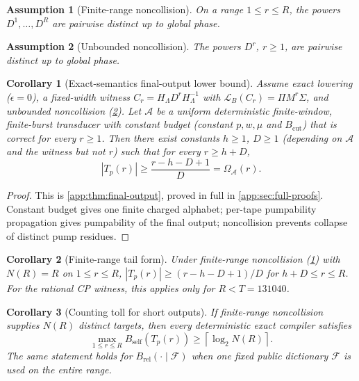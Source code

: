 \documentclass[aps,prx,reprint,floatfix,superscriptaddress]{revtex4-2}
\newtheorem{corollary}{Corollary}
\newtheorem{assumption}{Assumption}
\begin{document}
\begin{assumption}[Finite-range noncollision]
\label{ass:noncollision}
On a range $1 \leq r \leq R$, the powers $D^1,\ldots,D^R$ are pairwise
distinct up to global phase.
\end{assumption}

\begin{assumption}[Unbounded noncollision]
\label{ass:unbounded-noncollision}
The powers $D^r$, $r \geq 1$, are pairwise distinct up to global phase.
\end{assumption}

\begin{corollary}[Exact-semantics final-output lower bound]
\label{cor:exact-semantics-corollary}
\label{thm:final-output}
Assume exact lowering ($\epsilon = 0$), a fixed-width witness
$C_r = H_\Lambda D^r H_\Lambda^{-1}$ with
$\mathcal{L}_B(C_r) = \Pi M^r \Sigma$, and unbounded noncollision
(\cref{ass:unbounded-noncollision}). Let $\mathcal{A}$ be a uniform
deterministic finite-window, finite-burst transducer with constant budget
(constant $p,w,\mu$ and $B_{\mathrm{cut}}$) that is correct for every
$r \geq 1$. Then there exist constants
$h \geq 1$, $D \geq 1$ (depending on $\mathcal{A}$ and the witness but not
$r$) such that for every $r \geq h + D$,
\begin{equation}\label{eq:exact-output-bound}
  |T_p(r)| \geq \frac{r-h-D+1}{D} = \Omega_{\mathcal{A}}(r).
\end{equation}
\end{corollary}

\begin{proof}
This is \cref{app:thm:final-output}, proved in full in
\cref{app:sec:full-proofs}. Constant budget gives one finite
charged alphabet; per-tape pumpability propagation gives pumpability of the
final output; noncollision prevents collapse of distinct pump residues.
\end{proof}

\begin{corollary}[Finite-range tail form]
\label{cor:finite-tail}
Under finite-range noncollision (\cref{ass:noncollision}) with $N(R)=R$ on
$1 \leq r \leq R$, $|T_p(r)| \geq (r-h-D+1)/D$ for $h+D \leq r \leq R$.
For the rational CP witness, this applies only for $R < T = 131040$.
\end{corollary}

\begin{corollary}[Counting toll for short outputs]
\label{cor:counting-toll}
If finite-range noncollision supplies $N(R)$ distinct targets, then every
deterministic exact compiler satisfies
\begin{equation*}
 \max_{1\leq r\leq R}B_{\mathrm{self}}(T_p(r))
 \geq \left\lceil\log_2N(R)\right\rceil.
\end{equation*}
The same statement holds for $B_{\mathrm{rel}}(\cdot\mid\mathcal F)$
when one fixed public dictionary $\mathcal F$ is used on the entire range.
\end{corollary}
\end{document}

